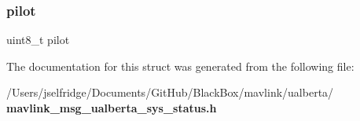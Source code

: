 \mbox{\label{struct____mavlink__ualberta__sys__status__t_ac530216f1a9c85d28b84662f75bbec76}} 
\subsubsection{pilot}
{\footnotesize\ttfamily uint8\+\_\+t pilot}



The documentation for this struct was generated from the following file\+:\begin{DoxyCompactItemize}
\item 
/\+Users/jselfridge/\+Documents/\+Git\+Hub/\+Black\+Box/mavlink/ualberta/\textbf{ mavlink\+\_\+msg\+\_\+ualberta\+\_\+sys\+\_\+status.\+h}\end{DoxyCompactItemize}

